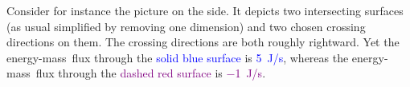 \documentclass[a4paper,12pt,%
onecolumn,oneside,%
british%
]{memoir}
\renewcommand*{\|}[1][]{\nonscript\:#1\vert\nonscript\:\mathopen{}}
\newcommand*{\energym}{energy-mass}
\begin{document}
Consider for instance the picture on the side.
%
%
It depicts two intersecting surfaces (as usual simplified by removing one dimension) and two chosen crossing directions on them. The crossing directions are both roughly rightward. Yet the \energym\ flux through the \textcolor{blue}{solid blue surface} is \textcolor{blue}{\qty{+5}{J/s}}, whereas the \energym\ flux through the \textcolor{purple}{dashed red surface} is \textcolor{purple}{\qty{-1}{J/s}}.

\end{document}
